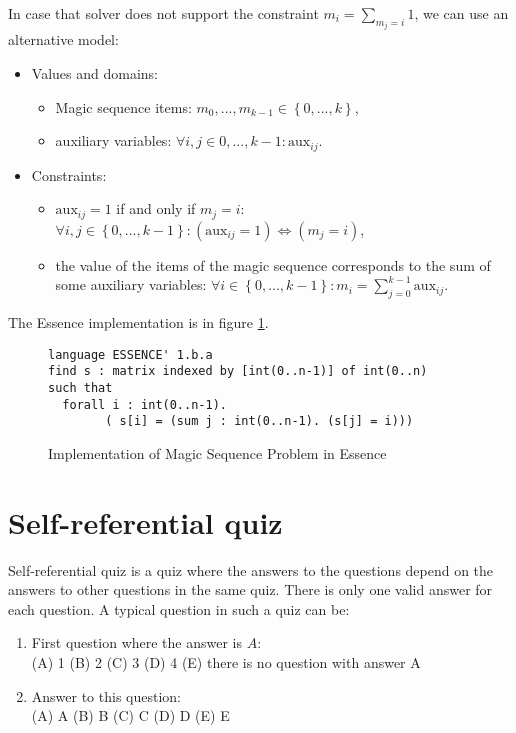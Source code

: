 In case that solver does not support the constraint $m_i = \sum_{m_j = i}{1}$, we 
can use an alternative model: 

\begin{itemize}
	\item Values and domains:
  \begin{itemize} 
	 \item Magic sequence items: $m_0, ..., m_{k-1} \in \left\{0, ..., k\right\}$,
	 \item auxiliary variables: $\forall i,j \in {0, ..., k-1}: \mathrm{aux}_{ij}$.
	\end{itemize}
	\item Constraints:
	 \begin{itemize}
    \item $\mathrm{aux}_{ij} = 1$ if and only if $m_j = i$: $\forall i,j \in \left\{0, ..., k-1\right\}: 
          (\mathrm{aux}_{ij} = 1) \Leftrightarrow (m_j = i)$,
	  \item the value of the items of the magic sequence corresponds to the sum of some auxiliary variables: 
          $\forall i \in \left\{0, ..., k-1\right\}: m_i = \sum_{j=0}^{k-1}{\mathrm{aux}_{ij}}$.
    \end{itemize}
\end{itemize}
The Essence implementation is in figure \ref{benchmark-essence:mseq}.

\begin{figure}
\caption{\label{benchmark-essence:mseq}Implementation of Magic Sequence Problem in Essence}
\begin{lstlisting}
language ESSENCE' 1.b.a
find s : matrix indexed by [int(0..n-1)] of int(0..n)
such that
  forall i : int(0..n-1).
        ( s[i] = (sum j : int(0..n-1). (s[j] = i)))
\end{lstlisting} 
\end{figure}

\section{Self-referential quiz}

Self-referential quiz is a quiz where the answers to the questions depend on the answers
to other questions in the same quiz. There is only one valid answer for each question.
A typical question in such a quiz can be: 

\begin{enumerate}
  \item First question where the answer is $A$: \\
    (A) 1 (B) 2 (C) 3 (D) 4 (E) there is no question with answer A
  \item Answer to this question: \\ 
    (A) A (B) B (C) C (D) D (E) E
\end{enumerate}

